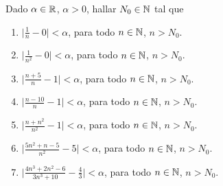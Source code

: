     \item Dado $\alpha \in \mathbb{R}$, $\alpha > 0$, hallar $N_0\in\mathbb{N}$ tal que
    \begin{enumerate}
            \item $\Big|\frac1n - 0\Big| < \alpha$, para todo $n\in\mathbb{N}$, $n > N_0$.
            \item $\Big|\frac1{n^2} - 0\Big| < \alpha$, para todo $n\in\mathbb{N}$, $n > N_0$.
            \item $\Big|\frac{n + 5}n-1 \Big|< \alpha$, para todo $n\in\mathbb{N}$, $n > N_0$.
            \item $\Big|\frac{n - 10}n-1\Big| < \alpha$, para todo $n\in\mathbb{N}$, $n > N_0$.
            \item $\Big|\frac{n+n^2}{n^2} - 1\Big| < \alpha$, para todo $n\in\mathbb{N}$, $n > N_0$.
            \item $\Big| \frac{5n^2 + n - 5}{n^2}-5\Big| < \alpha$, para todo $n\in\mathbb{N}$, $n > N_0$.
            \item $\Big| \frac{4n^3+2n^2-6}{3n^3+10} - \frac43\Big|  < \alpha$, para todo $n\in\mathbb{N}$, $n > N_0$.
    \end{enumerate}
